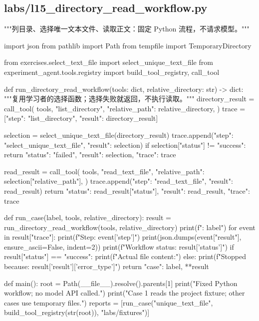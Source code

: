 \subsection{labs/l15\_directory\_read\_workflow.py}

\begin{Code}
"""列目录、选择唯一文本文件、读取正文：固定 Python 流程，不请求模型。"""

import json
from pathlib import Path
from tempfile import TemporaryDirectory

from exercises.select_text_file import select_unique_text_file
from experiment_agent.tools.registry import build_tool_registry, call_tool


def run_directory_read_workflow(tools: dict, relative_directory: str) -> dict:
    """复用学习者的选择函数；选择失败就返回，不执行读取。"""
    directory_result = call_tool(
        tools, "list_directory", {"relative_path": relative_directory},
    )
    trace = [{"step": "list_directory", "result": directory_result}]

    selection = select_unique_text_file(directory_result)
    trace.append({"step": "select_unique_text_file", "result": selection})
    if selection["status"] != "success":
        return {"status": "failed", "result": selection, "trace": trace}

    read_result = call_tool(
        tools, "read_text_file", {"relative_path": selection["relative_path"]},
    )
    trace.append({"step": "read_text_file", "result": read_result})
    return {"status": read_result["status"], "result": read_result, "trace": trace}


def run_case(label, tools, relative_directory):
    result = run_directory_read_workflow(tools, relative_directory)
    print(f"\nCase: {label}")
    for event in result["trace"]:
        print(f"Step: {event['step']}")
        print(json.dumps(event["result"], ensure_ascii=False, indent=2))
    print(f"Workflow status: {result['status']}")
    if result["status"] == "success":
        print(f"Actual file content:")
    else:
        print(f"Stopped because: {result['result']['error_type']}")
    return {"case": label, **result}


def main():
    root = Path(__file__).resolve().parents[1]
    print("Fixed Python workflow; no model API called.")
    print("Case 1 reads the project fixture; other cases use temporary files.")
    reports = [run_case("unique_text_file", build_tool_registry(str(root)), "labs/fixtures")]


\end{Code}
